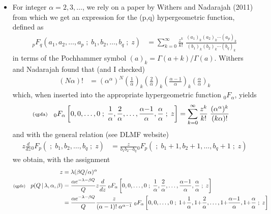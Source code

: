 \documentclass[11pt]{article}
\newcommand{\lleq}[1]{\label{#1} }
\renewcommand{\lleq}[1]{\label{#1} {\scriptstyle {\rm (#1)}} \hspace*{2ex} }
\newcommand{\cond}{\,|\,}
\begin{document}
\begin{itemize}
\item For integer $\alpha = 2,3,\ldots$, we rely on a paper by Withers and
  Nadarajah (2011) from which we get an expression for the (p,q) hypergeometric
  function, defined as
  \begin{align}
    {}_pF_q\left( a_1,a_2,\ldots, a_p\;;\; b_1,b_2,\ldots,b_q\;;\; z \right)
    &= \sum_{k=0}^\infty \frac{z^k}{k!} \;
      \frac{(a_1)_k(a_2)_k\cdots (a_p)_k}{(b_1)_k(b_2)_k\cdots (b_q)_k}
  \end{align}
  in terms of the Pochhammer symbol $(a)_k = \Gamma(a+k)/\Gamma(a)$. Withers
  and Nadarajah found that (and I checked)
  \begin{align}
    (N\alpha)!
    &= (\alpha^\alpha)^N
      \left(\frac{1}{\alpha}\right)_k
      \left(\frac{2}{\alpha}\right)_k
      \left(\frac{\alpha{-}1}{\alpha}\right)_k
      \left(\frac{\alpha}{\alpha}\right)_k
  \end{align}
  which, when inserted into the appropriate hypergeometric function
  ${}_0F_\alpha$, yields
  \begin{align}
    \lleq{qpfa}
    {}_0F_\alpha\left[ 0,0,\ldots,0 \;;\;
    \frac{1}{\alpha},
    \frac{2}{\alpha},
    \ldots,
    \frac{\alpha{-}1}{\alpha},
    \frac{\alpha}{\alpha}
    \;;\; z \right]
    &= \sum_{k=0}^\infty \frac{z^k}{k!} \;\frac{(\alpha^\alpha)^k}{(k\alpha)!}
  \end{align}
  and with the general relation (see DLMF website)
  \begin{align}
    z\frac{d}{dz} {}_0F_p(\;;\;b_1,b_2,\ldots,b_q\;;\;z)
    &= \frac{z}{b_1b_2\cdots b_q}
      {}_0F_p(\;;\;b_1{+}1,b_2{+}1,\ldots,b_q{+}1\;;\;z)
  \end{align}
  we obtain, with the assignment
  \begin{align}
    z &= \lambda (\beta Q / \alpha)^\alpha \\
    \lleq{qpfe}
    p(Q\cond \lambda,\alpha,\beta)
      &= \frac{\alpha e^{-\lambda - \beta Q} }{Q}
        z\frac{d}{dz} \;
        {}_0F_\alpha\left[ 0,0,\ldots,0 \;;\;
        \frac{1}{\alpha},
        \frac{2}{\alpha},
        \ldots,
        \frac{\alpha{-}1}{\alpha},
        \frac{\alpha}{\alpha}
        \;;\; z \right]
        \nonumber\\
      &= \frac{\alpha e^{-\lambda - \beta Q} }{Q}
        \frac{z}{(\alpha-1)!\;\alpha^{\alpha-1}} \;
        {}_0F_\alpha\left[ 0,0,\ldots,0 \;;\;
        1{+}\frac{1}{\alpha},
        1{+}\frac{2}{\alpha},
        \ldots,
        1{+}\frac{\alpha{-}1}{\alpha},
        1{+}\frac{\alpha}{\alpha}
        \;;\; z \right]

\end{align}
\end{itemize}
\end{document}
